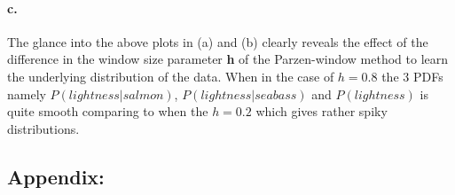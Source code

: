 \documentclass[a4paper]{article}
\begin{document}
\paragraph{c.} The glance into the above plots in (a) and (b) clearly reveals the effect of the difference in the window size parameter \textbf{h} of the Parzen-window method to learn the underlying distribution of the data. When in the case of $h=0.8$ the 3 PDFs namely $P(lightness|salmon)$, $P(lightness|seabass)$ and $P(lightness)$ is quite smooth comparing to when the $h=0.2$ which gives rather spiky distributions.


\newpage
\subsection*{Appendix:}














\end{document}
